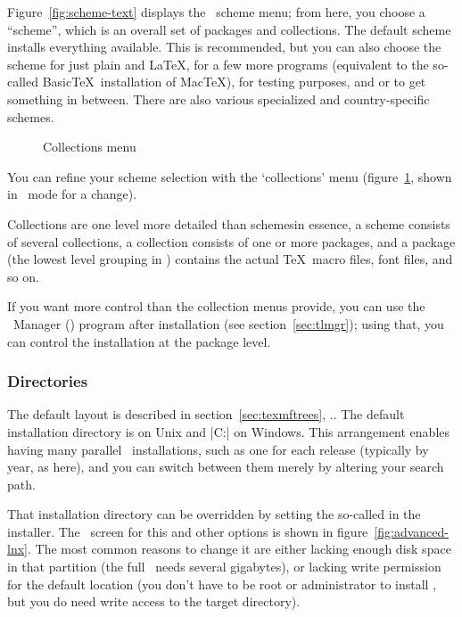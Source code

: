 \documentclass[12pt]{article}
\begin{document}
Figure~\ref{fig:scheme-text} displays the \TL\ scheme menu; from here,
you choose a ``scheme'', which is an overall set of packages and collections.
The default  scheme installs everything available. This is
recommended, but you can also choose the  scheme for
just plain and \LaTeX,  for a few more programs
(equivalent to the so-called Basic\TeX\ installation of Mac\TeX),
 for testing purposes, and  or
 to get something in between. There are also various
specialized and country-specific schemes.

\begin{figure}[tb]
\def\figdesc{Collections menu}
\centering \tlpng{stdcoll}{.7\linewidth}{\figdesc}
\caption{\figdesc}\label{fig:collections-gui}
\end{figure}

You can refine your scheme selection with the `collections' menu
(figure~\ref{fig:collections-gui}, shown in \GUI\ mode for a change).

Collections are one level more detailed than schemes\Dash in essence, a
scheme consists of several collections, a collection consists of one or
more packages, and a package (the lowest level grouping in \TL) contains
the actual \TeX\ macro files, font files, and so on.

If you want more control than the collection menus provide, you can use
the \TL\ Manager () program after installation (see
section~\ref{sec:tlmgr}); using that, you can control the installation
at the package level.

\subsubsection{Directories}
\label{sec:directories}

The default layout is described in section~\ref{sec:texmftrees},
\p.\pageref{sec:texmftrees}.  The default installation directory is
 on Unix and
|C:\texlive{}| on Windows.  This arrangement enables
having many parallel \TL\ installations, such as one for each release
(typically by year, as here), and you can switch between them merely by
altering your search path.

That installation directory can be overridden by setting the so-called
 in the installer.  The \GUI\ screen for this and other
options is shown in figure~\ref{fig:advanced-lnx}.  The most common reasons
to change it are either lacking enough disk space in that partition (the
full \TL\ needs several gigabytes), or lacking write permission for the
default location (you don't have to be root or administrator to install
\TL, but you do need write access to the target directory).
\end{document}
